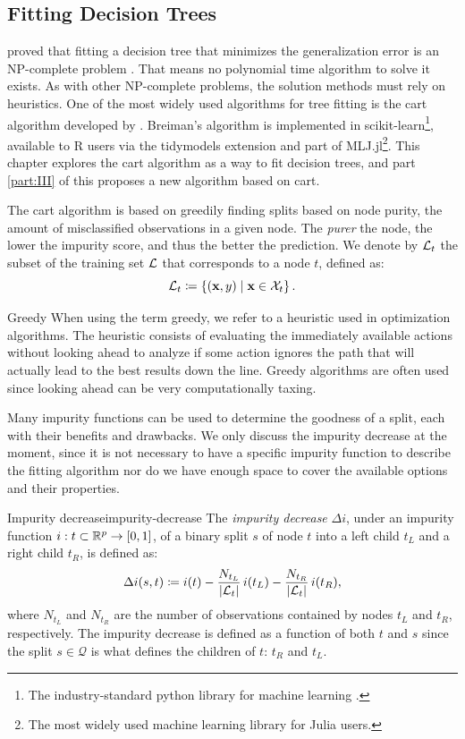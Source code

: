 \subsection{Fitting Decision Trees}

\citeauthor{hyafil1976} proved that fitting a decision tree that minimizes the
generalization error is an NP-complete problem \cite{hyafil1976}. That means no
polynomial time algorithm to solve it exists. As with other NP-complete
problems, the solution methods must rely on heuristics. One of the most widely
used algorithms for tree fitting is the \acl{cart} algorithm developed by
\citeauthor{breiman2017} \cite{breiman2017}. Breiman's algorithm is implemented
in scikit-learn\footnote{The industry-standard python library for machine
learning \cite{louppe2014}.}, available to R users via the tidymodels extension
and part of MLJ.jl\footnote{The most widely used machine learning library for
Julia users.}. This chapter explores the \ac{cart} algorithm as a way to fit
decision trees, and part \ref{part:III} of this proposes a new algorithm based
on \ac{cart}.

The \ac{cart} algorithm is based on greedily finding splits based on node
purity, the amount of misclassified observations in a given node. The
\textit{purer} the node, the lower the impurity score, and thus the better the
prediction. We denote by $\mathcal{L}_t$ the subset of the training set $\mathcal{L}$ that
corresponds to a node $t$, defined as:
\[
    \mathcal{L}_t \coloneqq \left\{ (\mathbf{x}, y) \mid \mathbf{x} \in \mathcal{X}_t \right\}.
\]

\begin{remark}{Greedy}
    When using the term greedy, we refer to a heuristic used in optimization
    algorithms. The heuristic consists of evaluating the immediately available
    actions without looking ahead to analyze if some action ignores the path
    that will actually lead to the best results down the line. Greedy algorithms
    are often used since looking ahead can be very computationally taxing.
\end{remark}

Many impurity functions can be used to determine the goodness of a split, each
with their benefits and drawbacks. We only discuss the impurity decrease at the
moment, since it is not necessary to have a specific impurity function to
describe the fitting algorithm nor do we have enough space to cover the
available options and their properties.

\begin{dfn}{Impurity decrease}{impurity-decrease}
    The \emph{impurity decrease} $\Delta i$, under an impurity function $i: t
    \subset \mathbb{R}^{p} \to [0, 1]$, of a binary split $s$ of node $t$ into a left
    child $t_L$ and a right child $t_R$, is defined as: 
    \[
        \Delta i(s, t) \coloneqq i(t) - \frac{N_{t_L}}{|\mathcal{L}_t|} \, i(t_L) - \frac{N_{t_R}}{|\mathcal{L}_t|} \, i(t_R),
    \]
    where $N_{t_L}$ and $N_{t_R}$ are the number of observations contained by
    nodes $t_L$ and $t_R$, respectively. The impurity decrease is defined as a
    function of both $t$ and $s$ since the split $s \in \mathcal{Q}$ is what
    defines the children of $t$: $t_R$ and $t_L$.
\end{dfn}

